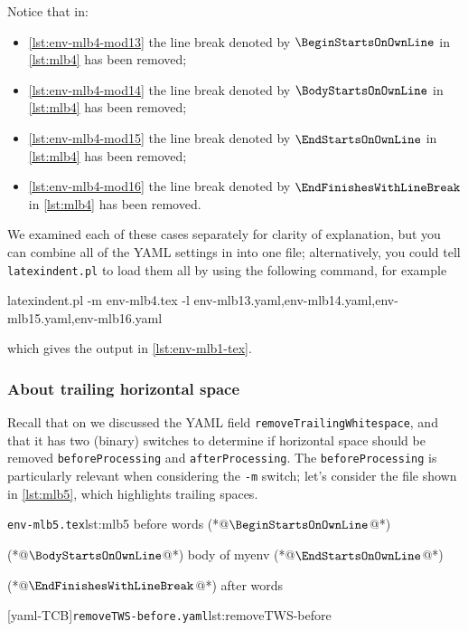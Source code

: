 	Notice that in: \begin{itemize} \item \cref{lst:env-mlb4-mod13} the line break denoted by $\BeginStartsOnOwnLine$ in \cref{lst:mlb4} has been removed;
		\item \cref{lst:env-mlb4-mod14} the line break denoted by $\BodyStartsOnOwnLine$ in \cref{lst:mlb4} has been removed;
		\item \cref{lst:env-mlb4-mod15} the line break denoted by $\EndStartsOnOwnLine$ in \cref{lst:mlb4} has been removed;
		\item \cref{lst:env-mlb4-mod16} the line break denoted by $\EndFinishesWithLineBreak$ in \cref{lst:mlb4} has been removed.
	\end{itemize}
	We examined each of these cases separately for clarity of explanation, but you can combine all of the YAML settings in  into one file; alternatively, you could tell \texttt{latexindent.pl} to load them all by using the following command, for example \begin{widepage} \begin{commandshell}
latexindent.pl -m env-mlb4.tex -l env-mlb13.yaml,env-mlb14.yaml,env-mlb15.yaml,env-mlb16.yaml
\end{commandshell} \end{widepage} which gives the output in \vref{lst:env-mlb1-tex}.

\subsubsection{About trailing horizontal space}
	Recall that on  we discussed the YAML field \texttt{removeTrailingWhitespace}, and that it has two (binary) switches to determine if horizontal space should be removed \texttt{beforeProcessing} and \texttt{afterProcessing}.
	The \texttt{beforeProcessing} is particularly relevant when considering the \texttt{-m} switch; let's consider the file shown in \cref{lst:mlb5}, which highlights trailing spaces.

	\begin{minipage}{.45\linewidth}
		\begin{cmhlistings}[showspaces=true,escapeinside={(*@}{@*)}]{\texttt{env-mlb5.tex}}{lst:mlb5}
before words   (*@$\BeginStartsOnOwnLine$@*) 
\begin{myenv}           (*@$\BodyStartsOnOwnLine$@*)
body of myenv      (*@$\EndStartsOnOwnLine$@*) 
\end{myenv}     (*@$\EndFinishesWithLineBreak$@*)
after words
\end{cmhlistings}
	\end{minipage}
	\hfill
	\begin{minipage}{.45\linewidth}
		[yaml-TCB]{\texttt{removeTWS-before.yaml}}{lst:removeTWS-before}
	\end{minipage}

